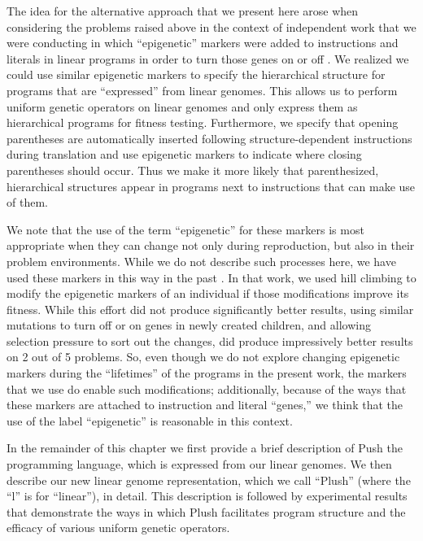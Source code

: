 \documentclass[graybox]{svmult}
\begin{document}
The idea for the alternative approach that we present here arose when considering the problems raised above in the context of independent work that we were conducting in which ``epigenetic'' markers were added to instructions and literals in linear programs in order to turn those genes on or off \cite{LaCava:2014:GPTP, LaCava:2014:GECCOcomp, LaCava:2015:GECCO}.
We realized we could use similar epigenetic markers to specify the hierarchical structure for programs that are ``expressed'' from linear genomes. This allows us to perform uniform genetic operators on linear genomes and only express them as hierarchical programs for fitness testing.
Furthermore, we specify that opening parentheses are automatically inserted following structure-dependent instructions during translation and use epigenetic markers to indicate where closing parentheses should occur. Thus we make it more likely that parenthesized, hierarchical structures appear in programs next to instructions that can make use of them.

We note that the use of the term ``epigenetic'' for these markers is most appropriate when they can change not only during reproduction, but also in their problem environments. While we do not describe such processes here, we have used these markers in this way in the past \cite{LaCava:2015:GECCO}. In that work, we used hill climbing to modify the epigenetic markers of an individual if those modifications improve its fitness. While this effort did not produce significantly better results, using similar mutations to turn off or on genes in newly created children, and allowing selection pressure to sort out the changes, did produce impressively better results on 2 out of 5 problems. So, even though we do not explore changing epigenetic markers during the ``lifetimes'' of the programs in the present work, the markers that we use do enable such modifications; additionally, because of the ways that these markers are attached to instruction and literal ``genes,'' we think that the use of the label ``epigenetic'' is reasonable in this context.

In the remainder of this chapter we first provide a brief description of Push the programming language, which is expressed from our linear genomes. We then describe our new linear genome representation, which we call ``Plush'' (where the ``l'' is for ``linear''), in detail. This description is followed by experimental results that demonstrate the ways in which Plush facilitates program structure and the efficacy of various uniform genetic operators.
\end{document}
